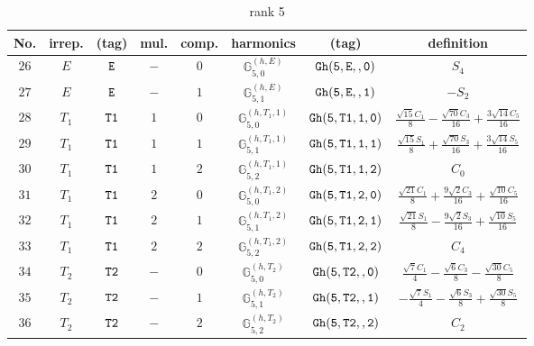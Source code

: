 \documentclass[fleqn,8pt]{jsarticle}
\begin{document}
\begin{table}[ht!]
\begin{center}
\caption{rank 5}
\renewcommand{\arraystretch}{1.3}
\begin{tabular}{cccccccc} \hline \hline
No. & irrep. & (tag) & mul. & comp. & harmonics & (tag) & definition \\ \hline
$ 26 $ & $ E $ & $ {\tt E} $ & $ - $ & $ 0 $ & $ \mathbb{G}_{5,0}^{(h,E)} $ & $ {\tt Gh(5,E,,0)} $ & $ S_{4} $ \\
$ 27 $ & $ E $ & $ {\tt E} $ & $ - $ & $ 1 $ & $ \mathbb{G}_{5,1}^{(h,E)} $ & $ {\tt Gh(5,E,,1)} $ & $ - S_{2} $ \\
$ 28 $ & $ T_{1} $ & $ {\tt T1} $ & $ 1 $ & $ 0 $ & $ \mathbb{G}_{5,0}^{(h,T_{1},1)} $ & $ {\tt Gh(5,T1,1,0)} $ & $ \frac{\sqrt{15} C_{1}}{8} - \frac{\sqrt{70} C_{3}}{16} + \frac{3 \sqrt{14} C_{5}}{16} $ \\
$ 29 $ & $ T_{1} $ & $ {\tt T1} $ & $ 1 $ & $ 1 $ & $ \mathbb{G}_{5,1}^{(h,T_{1},1)} $ & $ {\tt Gh(5,T1,1,1)} $ & $ \frac{\sqrt{15} S_{1}}{8} + \frac{\sqrt{70} S_{3}}{16} + \frac{3 \sqrt{14} S_{5}}{16} $ \\
$ 30 $ & $ T_{1} $ & $ {\tt T1} $ & $ 1 $ & $ 2 $ & $ \mathbb{G}_{5,2}^{(h,T_{1},1)} $ & $ {\tt Gh(5,T1,1,2)} $ & $ C_{0} $ \\
$ 31 $ & $ T_{1} $ & $ {\tt T1} $ & $ 2 $ & $ 0 $ & $ \mathbb{G}_{5,0}^{(h,T_{1},2)} $ & $ {\tt Gh(5,T1,2,0)} $ & $ \frac{\sqrt{21} C_{1}}{8} + \frac{9 \sqrt{2} C_{3}}{16} + \frac{\sqrt{10} C_{5}}{16} $ \\
$ 32 $ & $ T_{1} $ & $ {\tt T1} $ & $ 2 $ & $ 1 $ & $ \mathbb{G}_{5,1}^{(h,T_{1},2)} $ & $ {\tt Gh(5,T1,2,1)} $ & $ \frac{\sqrt{21} S_{1}}{8} - \frac{9 \sqrt{2} S_{3}}{16} + \frac{\sqrt{10} S_{5}}{16} $ \\
$ 33 $ & $ T_{1} $ & $ {\tt T1} $ & $ 2 $ & $ 2 $ & $ \mathbb{G}_{5,2}^{(h,T_{1},2)} $ & $ {\tt Gh(5,T1,2,2)} $ & $ C_{4} $ \\
$ 34 $ & $ T_{2} $ & $ {\tt T2} $ & $ - $ & $ 0 $ & $ \mathbb{G}_{5,0}^{(h,T_{2})} $ & $ {\tt Gh(5,T2,,0)} $ & $ \frac{\sqrt{7} C_{1}}{4} - \frac{\sqrt{6} C_{3}}{8} - \frac{\sqrt{30} C_{5}}{8} $ \\
$ 35 $ & $ T_{2} $ & $ {\tt T2} $ & $ - $ & $ 1 $ & $ \mathbb{G}_{5,1}^{(h,T_{2})} $ & $ {\tt Gh(5,T2,,1)} $ & $ - \frac{\sqrt{7} S_{1}}{4} - \frac{\sqrt{6} S_{3}}{8} + \frac{\sqrt{30} S_{5}}{8} $ \\
$ 36 $ & $ T_{2} $ & $ {\tt T2} $ & $ - $ & $ 2 $ & $ \mathbb{G}_{5,2}^{(h,T_{2})} $ & $ {\tt Gh(5,T2,,2)} $ & $ C_{2} $ \\
 \hline \hline
\end{tabular}
\end{center}
\end{table}
\end{document}
